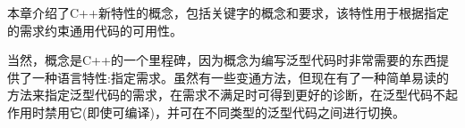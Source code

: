 本章介绍了C++新特性的概念，包括关键字的概念和要求，该特性用于根据指定的需求约束通用代码的可用性。

当然，概念是C++的一个里程碑，因为概念为编写泛型代码时非常需要的东西提供了一种语言特性:指定需求。虽然有一些变通方法，但现在有了一种简单易读的方法来指定泛型代码的需求，在需求不满足时可得到更好的诊断，在泛型代码不起作用时禁用它(即使可编译)，并可在不同类型的泛型代码之间进行切换。